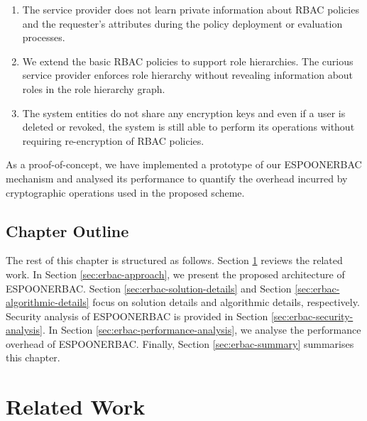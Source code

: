 \documentclass[epsfig,a4paper,11pt,titlepage]{book}
\numberwithin{algorithm}{chapter}
\begin{document}
\begin{enumerate}

	\item The service provider does not learn private information about \gls{RBAC} policies and the requester's attributes during the policy deployment or evaluation processes.
	
	\item We extend the basic \gls{RBAC} policies to support role hierarchies. The curious service provider enforces role hierarchy without revealing information about roles in the role hierarchy graph.
	
	\item The system entities do not share any encryption keys and even if a user is deleted or revoked, the system is still able to perform its operations without requiring re-encryption of \gls{RBAC} policies.

\end{enumerate}

As a proof-of-concept, we have implemented a prototype of our \gls{ESPOONERBAC} mechanism and analysed its performance to quantify the overhead incurred by cryptographic operations used in the proposed scheme.

\subsection{Chapter Outline}
The rest of this chapter is structured as follows. Section \ref{sec:erbac-related-work} reviews the related work. In Section \ref{sec:erbac-approach}, we present the proposed architecture of \gls{ESPOONERBAC}. Section \ref{sec:erbac-solution-details} and Section \ref{sec:erbac-algorithmic-details} focus on solution details and algorithmic details, respectively. Security analysis of \gls{ESPOONERBAC} is provided in Section \ref{sec:erbac-security-analysis}. In Section \ref{sec:erbac-performance-analysis}, we analyse the performance overhead of \gls{ESPOONERBAC}. Finally, Section \ref{sec:erbac-summary} summarises this chapter.

\section{Related Work}
\label{sec:erbac-related-work}
\end{document}
